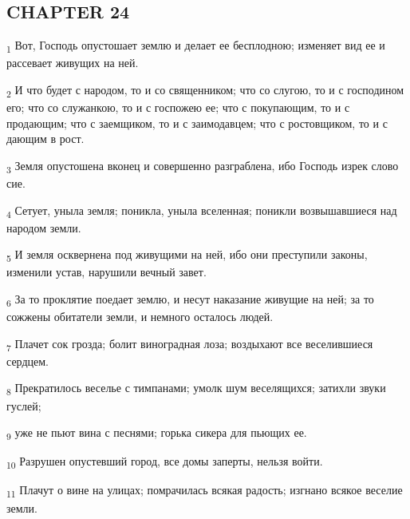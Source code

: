 \subsection{CHAPTER 24}
\begin{tcolorbox}
\textsubscript{1} Вот, Господь опустошает землю и делает ее бесплодною; изменяет вид ее и рассевает живущих на ней.
\end{tcolorbox}
\begin{tcolorbox}
\textsubscript{2} И что будет с народом, то и со священником; что со слугою, то и с господином его; что со служанкою, то и с госпожею ее; что с покупающим, то и с продающим; что с заемщиком, то и с заимодавцем; что с ростовщиком, то и с дающим в рост.
\end{tcolorbox}
\begin{tcolorbox}
\textsubscript{3} Земля опустошена вконец и совершенно разграблена, ибо Господь изрек слово сие.
\end{tcolorbox}
\begin{tcolorbox}
\textsubscript{4} Сетует, уныла земля; поникла, уныла вселенная; поникли возвышавшиеся над народом земли.
\end{tcolorbox}
\begin{tcolorbox}
\textsubscript{5} И земля осквернена под живущими на ней, ибо они преступили законы, изменили устав, нарушили вечный завет.
\end{tcolorbox}
\begin{tcolorbox}
\textsubscript{6} За то проклятие поедает землю, и несут наказание живущие на ней; за то сожжены обитатели земли, и немного осталось людей.
\end{tcolorbox}
\begin{tcolorbox}
\textsubscript{7} Плачет сок грозда; болит виноградная лоза; воздыхают все веселившиеся сердцем.
\end{tcolorbox}
\begin{tcolorbox}
\textsubscript{8} Прекратилось веселье с тимпанами; умолк шум веселящихся; затихли звуки гуслей;
\end{tcolorbox}
\begin{tcolorbox}
\textsubscript{9} уже не пьют вина с песнями; горька сикера для пьющих ее.
\end{tcolorbox}
\begin{tcolorbox}
\textsubscript{10} Разрушен опустевший город, все домы заперты, нельзя войти.
\end{tcolorbox}
\begin{tcolorbox}
\textsubscript{11} Плачут о вине на улицах; помрачилась всякая радость; изгнано всякое веселие земли.
\end{tcolorbox}
